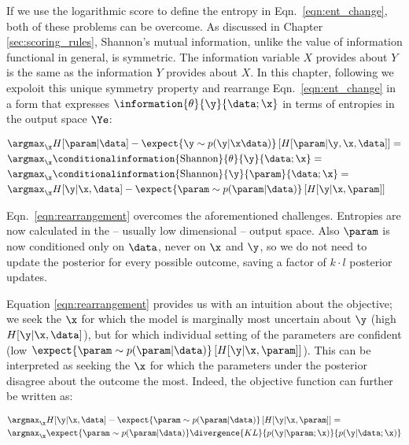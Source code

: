 If we use the logarithmic score to define the entropy in Eqn.\ \eqref{eqn:ent_change}, both of these problems can be overcome. As discussed in Chapter \ref{sec:scoring_rules}, Shannon's mutual information, unlike the value of information functional in general, is symmetric. The information variable $X$ provides about $Y$ is the same as the information $Y$ provides about $X$. In this chapter, following \citep{ExactInformation} we expoloit this unique symmetry property and rearrange Eqn.\ \eqref{eqn:ent_change} in a form that expresses $\information{\theta}{\y}{\data;\x}$ in terms of entropies in the output space $\Ye$:

\begin{align}
	&\argmax_{\x} H[\param | \data] - \expect{\y\sim p(\y|\x\data)} \left[ H[\param| \y, \x,\data] \right] =\\
	&\argmax_{\x} \conditionalinformation{\mbox{Shannon}}{\theta}{\y}{\data;\x} =\\
	&\argmax_{\x} \conditionalinformation{\mbox{Shannon}}{\y}{\param}{\data;\x} =\\
	&\argmax_{\x} H[\y \vert \x, \data] - \expect{\param\sim p(\param|\data)} \left[ H[\y \vert \x,\param] \right] \label{eqn:rearrangement} 
\end{align}

Eqn.\ \eqref{eqn:rearrangement} overcomes the aforementioned challenges. Entropies are now calculated in the -- usually low dimensional -- output space. Also $\param$ is now conditioned only on $\data$, never on $\x$ and $\y$, so we do not need to update the posterior for every possible outcome, saving a factor of $k\cdot l$ posterior updates.

Equation \eqref{eqn:rearrangement} provides us with an intuition about the objective; we seek the $\x$ for which the model is marginally most uncertain about $\y$ (high $H[\y \vert \x, \data]$), but for which individual setting of the parameters are confident (low $\expect{\param\sim p(\param|\data)} \left[ H[\y \vert \x,\param] \right]$). This can be interpreted as seeking the $\x$ for which the parameters under the posterior disagree about the outcome the most. Indeed, the objective function can further be written as:

\begin{align}
	&\argmax_{\x} H[\y \vert \x, \data] - \expect{\param\sim p(\param|\data)} \left[ H[\y \vert \x,\param] \right] = \\
	&\argmax_{\x} \expect{\param\sim p(\param|\data)}  \divergence{KL}{p(\y\vert\param;\x)}{p(\y\vert\data;\x)}
\end{align}

